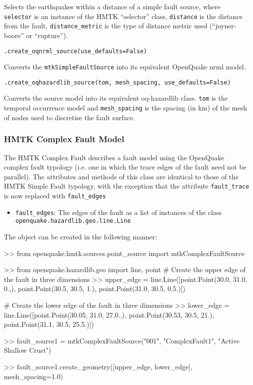 Selects the earthquakes within a distance of a simple fault source, where \verb=selector= is an instance of the HMTK ``selector'' class, \verb=distance= is the distance from the fault, \verb=distance_metric= is the type of distance metric used (``joyner-boore'' or ``rupture''). 

\verb;.create_oqnrml_source(use_defaults=False);

Converts the \verb=mtkSimpleFaultSource= into its equivalent OpenQuake nrml model.

\verb;.create_oqhazardlib_source(tom, mesh_spacing, use_defaults=False);

Converts the source model into its equivalent oq-hazardlib class. \verb=tom= is the temporal occurrence model and \verb=mesh_spacing= is the spacing (in km) of the mesh of nodes used to discretise the fault surface.

\subsubsection{HMTK Complex Fault Model}

The HMTK Complex Fault describes a fault model using the OpenQuake complex fault typology (i.e. one in which the trace edges of the fault need not be parallel). The attributes and methods of this class are identical to those of the HMTK Simple Fault typology, with the exception that the attribute \verb=fault_trace= is now replaced with \verb=fault_edges=

\begin{itemize}
\item \verb=fault_edges=: The edges of the fault as a list of instances of the class \\ \verb=openquake.hazardlib.geo.line.Line=
\end{itemize}

The object can be created in the following manner:

\begin{python}[frame=single]
>> from openquake.hmtk.sources.point_source import mtkComplexFaultSource

>> from openquake.hazardlib.geo import line, point
# Create the upper edge of the fault in three dimensions
>> upper_edge = line.Line([point.Point(30.0, 31.0, 0.,),
                           point.Point(30.5, 30.5, 1.),
                           point.Point(31.0, 30.5, 0.5.)]) 
                                 
# Create the lower edge of the fault in three dimensions
>> lower_edge = line.Line([point.Point(30.05, 31.0, 27.0.,),
                           point.Point(30.53, 30.5, 21.),
                           point.Point(31.1, 30.5, 25.5.)]) 

>> fault_source1 = mtkComplexFaultSource("001",
                                         "ComplexFault1",
                                         "Active Shallow Crust")

>> fault_source1.create_geometry([upper_edge,
                                  lower_edge],
                                  mesh_spacing=1.0)
\end{python}

